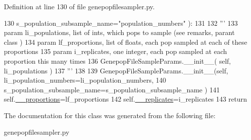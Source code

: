 Definition at line 130 of file genepopfilesampler.\+py.


\begin{DoxyCode}
130             s\_population\_subsample\_name=\textcolor{stringliteral}{"population\_numbers"} ):
131 
132         \textcolor{stringliteral}{'''}
133 \textcolor{stringliteral}{        param li\_populations, list of ints, which pops to sample (see remarks, parant class )}
134 \textcolor{stringliteral}{        param lf\_proportions, list of floats, each pop sampled at each of these proportions}
135 \textcolor{stringliteral}{        param i\_replicates, one integer, each pop sampled at each proportion this many times}
136 \textcolor{stringliteral}{        GenepopFileSampleParams.\_\_init\_\_( self, li\_populations )}
137 \textcolor{stringliteral}{        '''}
138 
139         GenepopFileSampleParams.\_\_init\_\_(self, li\_population\_numbers=li\_population\_numbers, 
140                 s\_population\_subsample\_name=s\_population\_subsample\_name )
141         self.\hyperlink{classnegui_1_1genepopfilesampler_1_1GenepopFileSampleParamsProportion_aa8dd8cef783da4e9bdb7c550e56382fd}{\_\_proportions}=lf\_proportions
142         self.\hyperlink{classnegui_1_1genepopfilesampler_1_1GenepopFileSampleParamsProportion_abebe5fb2092cd292a8d15269cb30bc33}{\_\_replicates}=i\_replicates
143         \textcolor{keywordflow}{return}
\end{DoxyCode}


The documentation for this class was generated from the following file\+:\begin{DoxyCompactItemize}
\item 
genepopfilesampler.\+py\end{DoxyCompactItemize}
